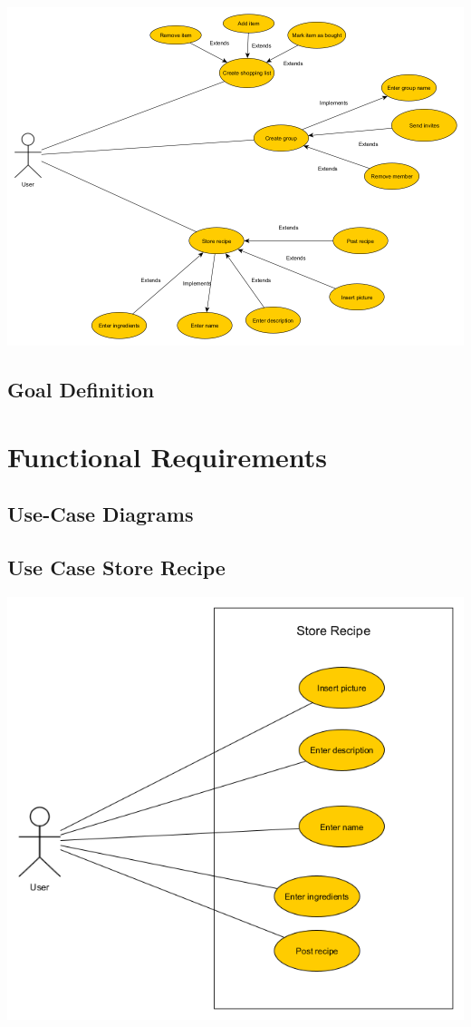 \documentclass[12pt]{article}
\theoremstyle{definition}
\begin{document}
\includegraphics[scale=.5]{UseCase.png}

\subsection{Goal Definition}

\pagebreak

\section{Functional Requirements}

\subsection{Use-Case Diagrams}

\subsection{Use Case Store Recipe}

\includegraphics[scale=.5]{UseCaseStoreRecipe.png}\\
\end{document}
